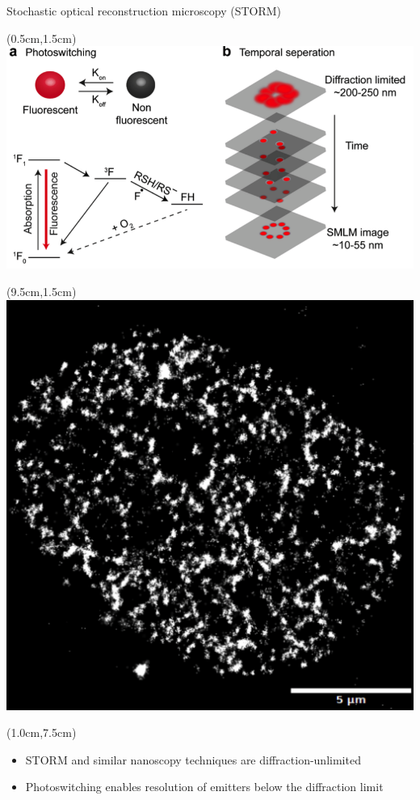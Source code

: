 \documentclass{beamer}					%
\begin{document}
\begin{frame}{Stochastic optical reconstruction microscopy (STORM)}
\begin{textblock*}{9cm}(0.5cm,1.5cm)
\includegraphics[width=\textwidth]{media/Intro.png}
\end{textblock*}
\begin{textblock*}{5cm}(9.5cm,1.5cm)
\includegraphics[width=\textwidth]{media/STORM-Example.png}
\end{textblock*}
\begin{textblock*}{\textwidth}(1.0cm,7.5cm)
\begin{itemize}
\item STORM and similar nanoscopy techniques are diffraction-unlimited
\item Photoswitching enables resolution of emitters below the diffraction limit
\end{itemize}
\end{textblock*}
\end{frame}
\end{document}
